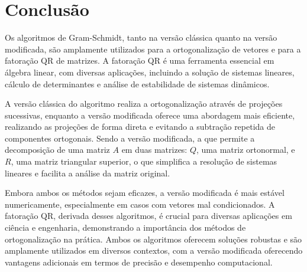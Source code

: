 \chapter{Conclusão}

Os algoritmos de Gram-Schmidt, tanto na versão clássica quanto na versão modificada, são amplamente utilizados para a ortogonalização de vetores e para a fatoração QR de matrizes. A fatoração QR é uma ferramenta essencial em álgebra linear, com diversas aplicações, incluindo a solução de sistemas lineares, cálculo de determinantes e análise de estabilidade de sistemas dinâmicos. 

A versão clássica do algoritmo realiza a ortogonalização através de projeções sucessivas, enquanto a versão modificada oferece uma abordagem mais eficiente, realizando as projeções de forma direta e evitando a subtração repetida de componentes ortogonais. Sendo a versão modificada, a que permite a decomposição de uma matriz \( A \) em duas matrizes: \( Q \), uma matriz ortonormal, e \( R \), uma matriz triangular superior, o que simplifica a resolução de sistemas lineares e facilita a análise da matriz original. 

Embora ambos os métodos sejam eficazes, a versão modificada é mais estável numericamente, especialmente em casos com vetores mal condicionados. A fatoração QR, derivada desses algoritmos, é crucial para diversas aplicações em ciência e engenharia, demonstrando a importância dos métodos de ortogonalização na prática. Ambos os algoritmos oferecem soluções robustas e são amplamente utilizados em diversos contextos, com a versão modificada oferecendo vantagens adicionais em termos de precisão e desempenho computacional.
